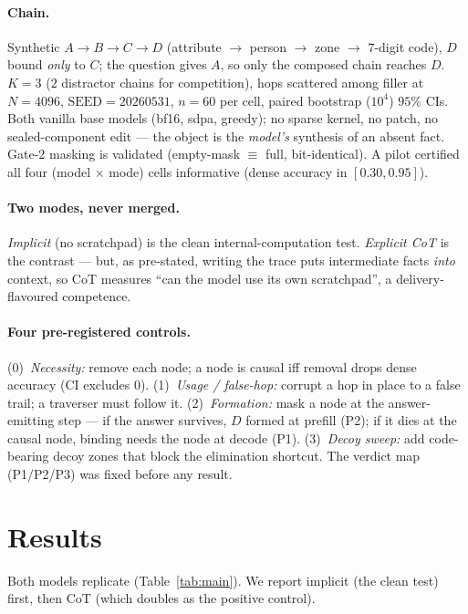 \documentclass[11pt]{article}
\begin{document}
\paragraph{Chain.} Synthetic $A\!\to\!B\!\to\!C\!\to\!D$ (attribute $\to$ person
$\to$ zone $\to$ $7$-digit code), $D$ bound \emph{only} to $C$; the question gives
$A$, so only the composed chain reaches $D$. $K{=}3$ ($2$ distractor chains for
competition), hops scattered among filler at $N{=}4096$, $\mathrm{SEED}{=}20260531$,
$n{=}60$ per cell, paired bootstrap ($10^4$) $95\%$ CIs. Both vanilla base models
(bf16, sdpa, greedy); no sparse kernel, no patch, no sealed-component edit --- the
object is the \emph{model's} synthesis of an absent fact. Gate-2 masking is validated
(empty-mask $\equiv$ full, bit-identical). A pilot certified all four (model $\times$
mode) cells informative (dense accuracy in $[0.30,0.95]$).

\paragraph{Two modes, never merged.} \emph{Implicit} (no scratchpad) is the clean
internal-computation test. \emph{Explicit CoT} is the contrast --- but, as
pre-stated, writing the trace puts intermediate facts \emph{into} context, so CoT
measures ``can the model use its own scratchpad'', a delivery-flavoured competence.

\paragraph{Four pre-registered controls.}
(0)~\emph{Necessity:} remove each node; a node is causal iff removal drops dense
accuracy (CI excludes $0$). (1)~\emph{Usage / false-hop:} corrupt a hop in place to a
false trail; a traverser must follow it. (2)~\emph{Formation:} mask a node at the
answer-emitting step --- if the answer survives, $D$ formed at prefill (P2); if it
dies at the causal node, binding needs the node at decode (P1). (3)~\emph{Decoy
sweep:} add code-bearing decoy zones that block the elimination shortcut. The
verdict map (P1/P2/P3) was fixed before any result.

\section{Results}
\label{sec:results}

Both models replicate (Table~\ref{tab:main}). We report implicit (the clean test)
first, then CoT (which doubles as the positive control).
\end{document}

